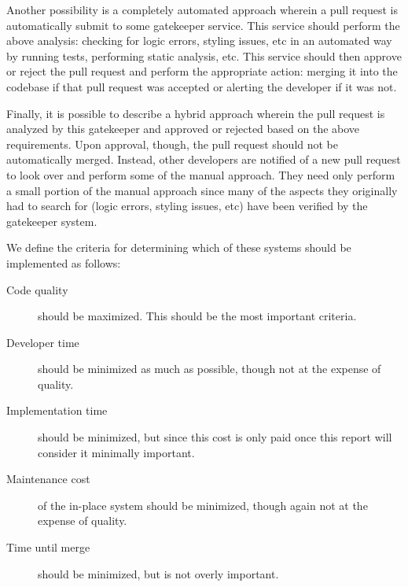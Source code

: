 \documentclass[12pt]{article}
\begin{document}
Another possibility is a completely automated approach wherein a pull request is automatically submit to some gatekeeper service. This service should perform the above analysis: checking for logic errors, styling issues, etc in an automated way by running tests, performing static analysis, etc. This service should then approve or reject the pull request and perform the appropriate action: merging it into the codebase if that pull request was accepted or alerting the developer if it was not.

Finally, it is possible to describe a hybrid approach wherein the pull request is analyzed by this gatekeeper and approved or rejected based on the above requirements. Upon approval, though, the pull request should not be automatically merged. Instead, other developers are notified of a new pull request to look over and perform some of the manual approach. They need only perform a small portion of the manual approach since many of the aspects they originally had to search for (logic errors, styling issues, etc) have been verified by the gatekeeper system.

We define the criteria for determining which of these systems should be implemented as follows:
\begin{description}
\item[Code quality] should be maximized. This should be the most important criteria.
\item[Developer time] should be minimized as much as possible, though not at the expense of quality.
\item[Implementation time] should be minimized, but since this cost is only paid once this report will consider it minimally important.
\item[Maintenance cost] of the in-place system should be minimized, though again not at the expense of quality.
\item[Time until merge] should be minimized, but is not overly important.
\end{description}
\end{document}
